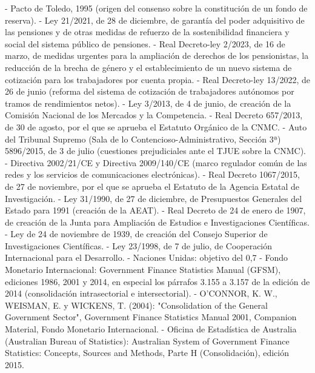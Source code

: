 \documentclass[10pt,a4paper]{article}
\begin{document}
- Pacto de Toledo, 1995 (origen del consenso sobre la constitución de un fondo de reserva).
- Ley 21/2021, de 28 de diciembre, de garantía del poder adquisitivo de las pensiones y de otras medidas de refuerzo de la sostenibilidad financiera y social del sistema público de pensiones.
- Real Decreto-ley 2/2023, de 16 de marzo, de medidas urgentes para la ampliación de derechos de los pensionistas, la reducción de la brecha de género y el establecimiento de un nuevo sistema de cotización para los trabajadores por cuenta propia.
- Real Decreto-ley 13/2022, de 26 de junio (reforma del sistema de cotización de trabajadores autónomos por tramos de rendimientos netos).
- Ley 3/2013, de 4 de junio, de creación de la Comisión Nacional de los Mercados y la Competencia.
- Real Decreto 657/2013, de 30 de agosto, por el que se aprueba el Estatuto Orgánico de la CNMC.
- Auto del Tribunal Supremo (Sala de lo Contencioso-Administrativo, Sección 3ª) 5896/2015, de 3 de julio (cuestiones prejudiciales ante el TJUE sobre la CNMC).
- Directiva 2002/21/CE y Directiva 2009/140/CE (marco regulador común de las redes y los servicios de comunicaciones electrónicas).
- Real Decreto 1067/2015, de 27 de noviembre, por el que se aprueba el Estatuto de la Agencia Estatal de Investigación.
- Ley 31/1990, de 27 de diciembre, de Presupuestos Generales del Estado para 1991 (creación de la AEAT).
- Real Decreto de 24 de enero de 1907, de creación de la Junta para Ampliación de Estudios e Investigaciones Científicas.
- Ley de 24 de noviembre de 1939, de creación del Consejo Superior de Investigaciones Científicas.
- Ley 23/1998, de 7 de julio, de Cooperación Internacional para el Desarrollo.
- Naciones Unidas: objetivo del 0,7%
- Fondo Monetario Internacional: Government Finance Statistics Manual (GFSM), ediciones 1986, 2001 y 2014, en especial los párrafos 3.155 a 3.157 de la edición de 2014 (consolidación intrasectorial e intersectorial).
- O'CONNOR, K. W., WEISMAN, E. y WICKENS, T. (2004): "Consolidation of the General Government Sector", Government Finance Statistics Manual 2001, Companion Material, Fondo Monetario Internacional.
- Oficina de Estadística de Australia (Australian Bureau of Statistics): Australian System of Government Finance Statistics: Concepts, Sources and Methods, Parte H (Consolidación), edición 2015.
\end{document}
